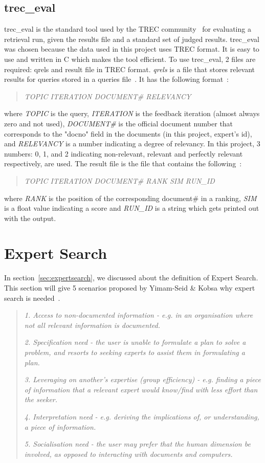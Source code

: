 \subsection{trec\_eval}\label{sec:treceval}
trec\_eval is the standard tool used by the TREC community~\cite{trec} for evaluating a retrieval run, given the results file and a
standard set of judged results. trec\_eval was chosen because the data used in this project uses TREC format. 
It is easy to use and written in C which makes the tool efficient. To use trec\_eval, 2 files are required: qrels and result file in TREC format.
\textit{qrels} is a file that stores relevant results for queries stored in a queries file~\cite{qrels}. It has the following format~\cite{qrelsformat}:
\begin{quotation}
 \textit{TOPIC ITERATION DOCUMENT\# RELEVANCY}
\end{quotation}
where \textit{TOPIC} is the query, \textit{ITERATION} is the feedback iteration (almost always zero and not used),
\textit{DOCUMENT\#} is the official document number that corresponds to the "docno" field in the documents (in this project, expert's id), and
\textit{RELEVANCY} is a number indicating a degree of relevancy. In this project, 3 numbers: 0, 1, and 2 indicating non-relevant, relevant and perfectly
relevant respectively, are used. The result file is the file that contains the following~\cite{resultfileformat}:
\begin{quotation}
 \textit{TOPIC ITERATION DOCUMENT\# RANK SIM RUN\_ID}
\end{quotation}
where \textit{RANK} is the position of the corresponding document\# in a ranking, \textit{SIM} is a float value indicating a score and \textit{RUN\_ID}
is a string which gets printed out with the output.



\section{Expert Search}
In section~\ref{sec:expertsearch}, we discussed about the definition of Expert Search. This section will give 5 scenarios proposed by Yimam-Seid \& Kobsa
why expert search is needed~\cite[P. 387]{expertsearch}.
\begin{quotation}
  \item \textit{1. Access to non-documented information - e.g. in an organisation where not all relevant information is documented.}
  \item \textit{2. Specification need - the user is unable to formulate a plan to solve a problem, and resorts to seeking experts to assist them in formulating a plan.}
  \item \textit{3. Leveraging on another's expertise (group efficiency) - e.g. finding a piece of information that a relevant expert would know/find with
  less effort than the seeker.}
  \item \textit{4. Interpretation need - e.g. deriving the implications of, or understanding, a piece of information.}
  \item \textit{5. Socialisation need - the user may prefer that the human dimension be involved, as opposed to interacting with documents and computers.}
\end{quotation}

